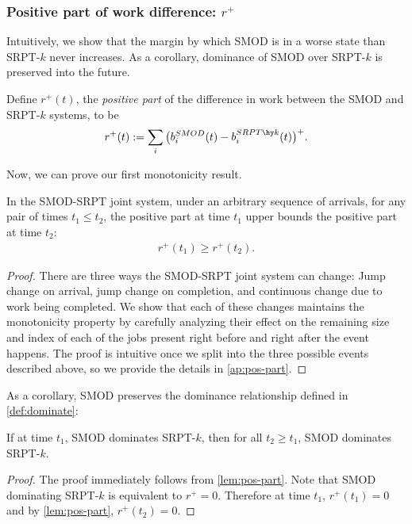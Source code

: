 \documentclass[acmsmall]{acmart}
\begin{document}
\begin{figure}[omitted: a diagram of this paper's results, not reproduced here]\label{diagram:worst-case}\end{figure}



\subsubsection{Positive part of work difference: $r^+$}
\label{sec:positive-part}

 Intuitively, we show that the margin by which SMOD is in a worse state than SRPT-$k$ never increases. As a corollary, dominance of SMOD over SRPT-$k$ is preserved into the future.

\begin{definition}\label{def:positive-part}
    Define $r^+(t)$, the \textit{positive part} of the difference in work between the SMOD and SRPT-$k$ systems,
    to be
    \begin{align*}
        r^+(t) := \sum_{i} \big(b_i^{SMOD}(t) - b_i^{SRPT\hy k}(t)\big)^+.
    \end{align*}
\end{definition}

Now, we can prove our first monotonicity result.
\begin{lemma}
\label{lem:pos-part}
    In the SMOD-SRPT joint system,
    under an arbitrary sequence of arrivals,
    for any pair of times $t_1 \le t_2$,
    the positive part at time $t_1$ upper bounds the positive part at time $t_2$:
    \begin{align*}
        r^+(t_1) \ge r^+(t_2).
    \end{align*}
\end{lemma}
\begin{proof}
    There are three ways the SMOD-SRPT joint system can change:
    Jump change on arrival, jump change on completion, and continuous change due to work being completed.
    We show that each of these changes maintains the monotonicity property by carefully analyzing their effect on the remaining size and index of each of the jobs present right before and right after the event happens. The proof is intuitive once we split into the three possible events described above, so we provide the details in \cref{ap:pos-part}.
\end{proof}

As a corollary, SMOD preserves the dominance relationship defined in \cref{def:dominate}:
\begin{corollary}
    \label{cor:dominance}
    If at time $t_1$, SMOD dominates SRPT-$k$, then for all $t_2 \ge t_1$,
    SMOD dominates SRPT-$k$.
\end{corollary}
\begin{proof}
    The proof immediately follows from \cref{lem:pos-part}.
    Note that SMOD dominating SRPT-$k$ is equivalent to $r^+ = 0$.
    Therefore at time $t_1$, $r^+(t_1) = 0$ and by \cref{lem:pos-part}, $r^+(t_2) = 0$.
\end{proof}
\end{document}
